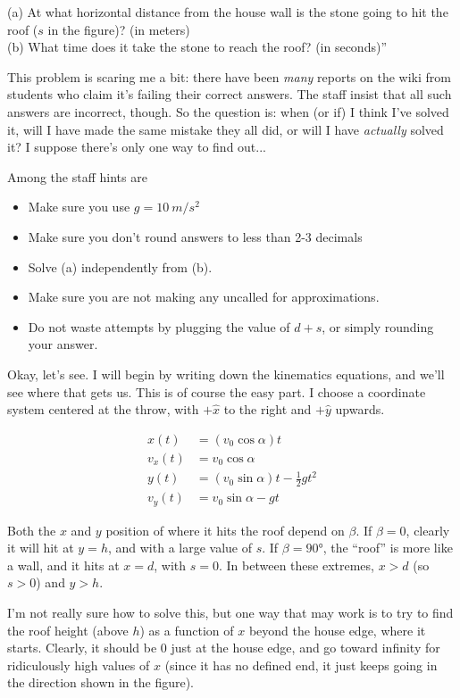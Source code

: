 \documentclass[8.01x]{subfiles}
\begin{document}
(a) At what horizontal distance from the house wall is the stone going to hit the roof ($s$ in the figure)? (in meters)\\
(b) What time does it take the stone to reach the roof? (in seconds)''

This problem is scaring me a bit: there have been \emph{many} reports on the wiki from students who claim it's failing their correct answers. The staff insist that all such answers are incorrect, though. So the question is: when (or if) I think I've solved it, will I have made the same mistake they all did, or will I have \emph{actually} solved it? I suppose there's only one way to find out...

Among the staff hints are

\begin{itemize}
\item Make sure you use $g = \SI{10}{m/s^2}$
\item Make sure you don't round answers to less than 2-3 decimals
\item Solve (a) independently from (b).
\item Make sure you are not making any uncalled for approximations.
\item Do not waste attempts by plugging the value of $d+s$, or simply rounding your answer.
\end{itemize}

Okay, let's see. I will begin by writing down the kinematics equations, and we'll see where that gets us. This is of course the easy part. I choose a coordinate system centered at the throw, with $+\hat{x}$ to the right and $+\hat{y}$ upwards.

\begin{align}
x(t)   &= (v_0 \cos \alpha) t\\
v_x(t) &= v_0 \cos \alpha\\
y(t)   &= (v_0 \sin \alpha) t - \frac{1}{2} g t^2\\
v_y(t) &= v_0 \sin \alpha - g t
\end{align}

Both the $x$ and $y$ position of where it hits the roof depend on $\beta$. If $\beta = 0$, clearly it will hit at $y = h$, and with a large value of $s$. If $\beta = \ang{90}$, the ``roof'' is more like a wall, and it hits at $x = d$, with $s = 0$. In between these extremes, $x > d$ (so $s > 0$) and $y > h$.

I'm not really sure how to solve this, but one way that may work is to try to find the roof height (above $h$) as a function of $x$ beyond the house edge, where it starts. Clearly, it should be $0$ just at the house edge, and go toward infinity for ridiculously high values of $x$ (since it has no defined end, it just keeps going in the direction shown in the figure).
\end{document}
